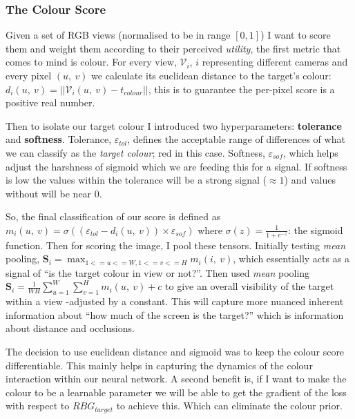 \subsubsection{The Colour Score}
Given a set of RGB views (normalised to be  in range \(\left[0, 1\right]\)) I want to score them and weight them according to their perceived \emph{utility}, the first metric that comes to mind is colour. For every view, $\mathcal{V}_i$, $i$ representing different cameras and every pixel $\left( u, ~v\right)$ we calculate its euclidean distance to the target's colour: \( d_i\left(u, ~v\right) = ||\mathcal{V}_i\left(u, ~v\right) - t_{colour}||\), this is to guarantee the per-pixel score is a positive real number. 


Then to isolate our target colour I introduced two hyperparameters: \textbf{tolerance} and \textbf{softness}. Tolerance, $\varepsilon_{tol}$, defines the acceptable range of differences of what we can classify as the \emph{target colour}; red in this case. Softness, $\varepsilon_{sof}$, which helps adjust the harshness of sigmoid which we are feeding this for a signal. If softness is low the values within the tolerance will be a strong signal ($\approx 1$) and values without will be near $0$. 

So, the final classification of our score is defined as \(m_i\left(u, ~v\right) = \sigma \left(\left(\varepsilon_{tol} - d_i\left(u, ~v\right)\right)\times \varepsilon_{sof} \right)\) where \(\sigma\left(z\right) = \frac{1}{1 + e^{-z}}\): the sigmoid function. 
Then for scoring the image, I pool these tensors. Initially testing \emph{mean} pooling, \(\mathbf{S}_i = \max_{1<=u<=W, 1<=v<=H}m_i(i, ~v)\), which essentially acts as a signal of ``is the target colour in view or not?''. Then used \emph{mean} pooling \(\mathbf{S}_i = {\frac{1}{WH}\sum_{u = 1}^{W}\sum_{v = 1}^{H}m_i\left(u, ~v\right)} + c\) to give an overall visibility of the target within a view -adjusted by a constant. This will capture more nuanced inherent information about ``how much of the screen is the target?'' which is information about distance and occlusions.

The decision to use euclidean distance and sigmoid was to keep the colour score differentiable. This mainly helps in capturing the dynamics of the colour interaction within our neural network. A second benefit is, if I want to make the colour to be a learnable parameter we will be able to get the gradient of the loss with respect to ${RBG}_{target}$ to achieve this. Which can eliminate the colour prior.

